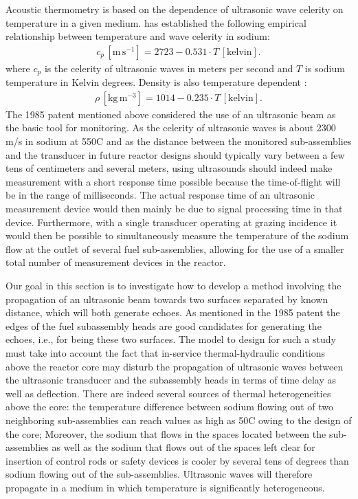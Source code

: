         Acoustic thermometry is based on the dependence of ultrasonic wave celerity on temperature in a given medium.
\textcite{Sobolev2011Databaseofthermophysical} has established the following empirical relationship between temperature and wave celerity in sodium:
        \begin{align}\label{eq:3_1}
            c_p\, [\text{m}\, \text{s}^{-1}] = 2723-0.531\cdot T\,[\text{kelvin}].
        \end{align}
        where $c_p$ is the celerity of ultrasonic waves in meters per second and $T$ is sodium temperature in Kelvin degrees.
        Density is also temperature dependent \parencite{Sobolev2011Databaseofthermophysical}:
        \begin{align}\label{eq:3_2}
            \rho\,[ \text{kg} \, \text{m}^{-3} ]=1014-0.235\cdot T\,[ \text{kelvin} ].
        \end{align}
        The 1985 patent mentioned above considered the use of an ultrasonic beam as the basic tool for monitoring. As the celerity of ultrasonic waves is about
2300 m/s in sodium at 550\textdegree{}C and as the distance between the monitored sub-assemblies and the transducer in future reactor designs should typically
vary between a few tens of centimeters and several meters, using ultrasounds should indeed make measurement with a short response time possible because the
time-of-flight will be in the range of milliseconds. The actual response time of an ultrasonic measurement device would then mainly be due to signal processing
time in that device. Furthermore, with a single transducer operating at grazing incidence it would then be possible to simultaneously measure the temperature
of the sodium flow at the outlet of several fuel sub-assemblies, allowing for the use of a smaller total number of measurement devices in the reactor.

        Our goal in this section is to investigate how to develop a method involving the propagation of an ultrasonic beam towards two surfaces separated by
known distance, which will both generate echoes. As mentioned in the 1985 patent the edges of the fuel subassembly heads are good candidates for generating the
echoes, i.e., for being these two surfaces. The model to design for such a study must take into account the fact that in-service thermal-hydraulic conditions
above the reactor core may disturb the propagation of ultrasonic waves between the ultrasonic transducer and the subassembly heads in terms of time delay as
well as deflection. There are indeed several sources of thermal heterogeneities above the core: the temperature difference between sodium flowing out of two
neighboring sub-assemblies can reach values as high as 50\textdegree{}C owing to the design of the core; Moreover, the sodium that flows in the spaces located
between the sub-assemblies as well as the sodium that flows out of the spaces left clear for insertion of control rods or safety devices is cooler by several
tens of degrees than sodium flowing out of the sub-assemblies. Ultrasonic waves will therefore propagate in a medium in which temperature is significantly
heterogeneous.

